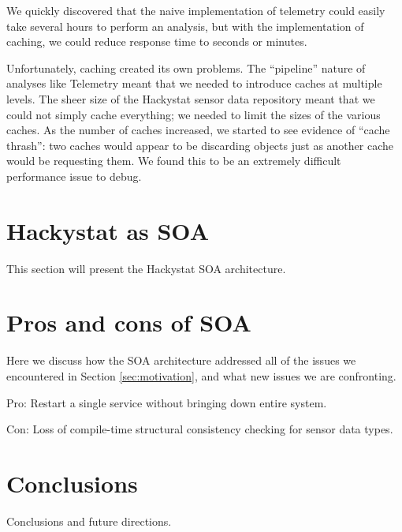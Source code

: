 \documentclass[conference,compsoc,peerreview]{IEEEtran}
\begin{document}
We quickly discovered that the naive implementation of telemetry could easily take several hours to perform an analysis, but with the implementation of caching, we could reduce response time to seconds or minutes.  

Unfortunately, caching created its own problems. The ``pipeline'' nature of analyses like Telemetry meant that we needed to introduce caches at multiple levels.  The sheer size of the Hackystat sensor data repository meant that we could not simply cache everything; we needed to limit the sizes of the various caches.  As the number of caches increased, we started to see evidence of ``cache thrash'': two caches would appear to be discarding objects just as another cache would be requesting them. We found this to be an extremely difficult performance issue to debug.


\section{Hackystat as SOA}
\label{sec:soa}

This section will present the Hackystat SOA architecture.

\section{Pros and cons of SOA}
\label{sec:discussion}

Here we discuss how the SOA architecture addressed all of the issues we encountered in Section \ref{sec:motivation}, and what new issues we are confronting. 

Pro: Restart a single service without bringing down entire system.

Con: Loss of compile-time structural consistency checking for sensor data types.

\section{Conclusions}
\label{sec:conclusion}

Conclusions and future directions. 




\end{document}
